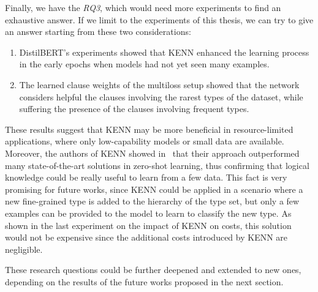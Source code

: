 Finally, we have the \textit{RQ3}, which would need more experiments to find an exhaustive answer. If we limit to the experiments of this thesis, we can try to give an answer starting from these two considerations:
\begin{enumerate}
    \item DistilBERT's experiments showed that KENN enhanced the learning process in the early epochs when models had not yet seen many examples.
    \item The learned clause weights of the multiloss setup showed that the network considers helpful the clauses involving the rarest types of the dataset, while suffering the presence of the clauses involving frequent types.
\end{enumerate}
These results suggest that KENN may be more beneficial in resource-limited applications, where only low-capability models or small data are available. Moreover, the authors of KENN showed in~\cite{kenn, daniele2021neural} that their approach outperformed many state-of-the-art solutions in zero-shot learning, thus confirming that logical knowledge could be really useful to learn from a few data. This fact is very promising for future works, since KENN could be applied in a scenario where a new fine-grained type is added to the hierarchy of the type set, but only a few examples can be provided to the model to learn to classify the new type. As shown in the last experiment on the impact of KENN on costs, this solution would not be expensive since the additional costs introduced by KENN are negligible.

These research questions could be further deepened and extended to new ones, depending on the results of the future works proposed in the next section.